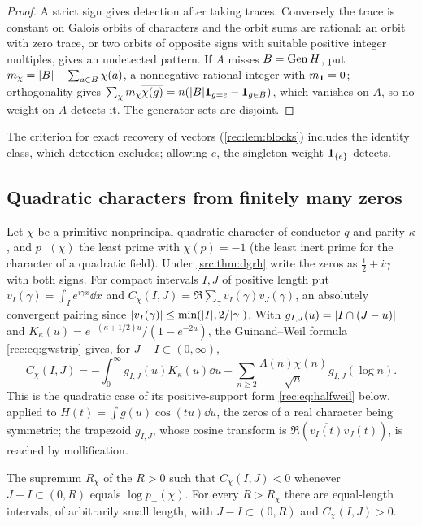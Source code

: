 \begin{proof}
A strict sign gives detection after taking traces. Conversely the trace is constant on Galois
orbits of characters and the orbit sums are rational: an orbit with zero trace, or two orbits of
opposite signs with suitable positive integer multiples, gives an undetected pattern. If $A$ misses
$B=\operatorname{Gen} H$, put $m_\chi=\lvert B\rvert-\sum_{a\in B}\chi(a)$, a nonnegative rational integer with
$m_{\mathbf{1}}=0$; orthogonality gives $\sum_\chi m_\chi\overline{\chi(g)}=n(\lvert B\rvert\mathbf 1_{g=e}-\mathbf 1_{g\in B})$,
which vanishes on $A$, so no weight on $A$ detects it. The generator sets are disjoint.
\end{proof}

The criterion for exact recovery of vectors (\cref{rec:lem:blocks}) includes the identity class,
which detection excludes; allowing $e$, the singleton weight $\mathbf 1_{\{e\}}$ detects.

\subsection{Quadratic characters from finitely many zeros}\label{rec:sec:quadratic}

Let $\chi$ be a primitive nonprincipal quadratic character of conductor $q$ and parity $\kappa$, and
$p_-(\chi)$ the least prime with $\chi(p)=-1$ (the least inert prime for the character of a
quadratic field). Under \cref{src:thm:dgrh} write the zeros as $\tfrac12+i\gamma$ with both signs. For
compact intervals $I,J$ of positive length put $v_I(\gamma)=\int_Ie^{i\gamma x}\dd x$ and
$C_\chi(I,J)=\Re\sum_\gamma\overline{v_I(\gamma)}v_J(\gamma)$, an absolutely convergent pairing since
$\lvert v_I(\gamma)\rvert\le\min(\lvert I\rvert,2/\lvert\gamma\rvert)$. With $g_{I,J}(u)=\lvert I\cap(J-u)\rvert$ and
$K_\kappa(u)=e^{-(\kappa+1/2)u}/(1-e^{-2u})$, the Guinand--Weil formula \eqref{rec:eq:gwstrip} gives, for
$J-I\subset(0,\infty)$,
\begin{equation}\label{rec:eq:packetweil}
 C_\chi(I,J)=-\int_0^\infty g_{I,J}(u)K_\kappa(u)\dd u-\sum_{n\ge2}\frac{\Lambda(n)\chi(n)}{\sqrt n}g_{I,J}(\log n).
\end{equation}
This is the quadratic case of its positive-support form \eqref{rec:eq:halfweil} below, applied to
$H(t)=\int g(u)\cos(tu)\dd u$, the zeros of a real character being symmetric; the trapezoid $g_{I,J}$, whose
cosine transform is $\Re(\overline{v_I(t)}v_J(t))$, is reached by mollification.

\begin{theorem}\label{rec:thm:signthreshold}
The supremum $R_\chi$ of the $R>0$ such that $C_\chi(I,J)<0$ whenever $J-I\subset(0,R)$ equals
$\log p_-(\chi)$. For every $R>R_\chi$ there are equal-length intervals, of arbitrarily small length,
with $J-I\subset(0,R)$ and $C_\chi(I,J)>0$.
\end{theorem}

